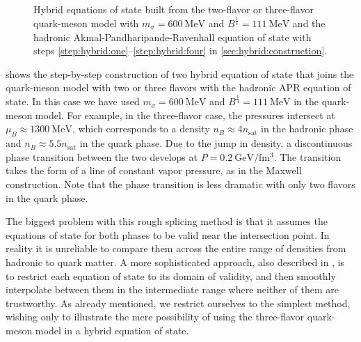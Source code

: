 \begin{figure}
\caption{\label{fig:hybrid:eos}%
Hybrid equations of state built from
the two-flavor or three-flavor quark-meson model
with $m_\sigma=\SI{600}{\mega\electronvolt}$ and $B^\frac14 = \SI{111}{\mega\electronvolt}$
and the hadronic Akmal-Pandharipande-Ravenhall equation of state
with steps \ref{step:hybrid:one}--\ref{step:hybrid:four} in \cref{sec:hybrid:construction}.
}
\end{figure}

 shows the step-by-step construction of two hybrid equation of state that joins the quark-meson model with two or three flavors with the hadronic APR equation of state.
In this case we have used $m_\sigma=\SI{600}{\mega\electronvolt}$ and $B^\frac14 = \SI{111}{\mega\electronvolt}$ in the quark-meson model.
For example, in the three-flavor case, the pressures intersect at $\mu_B \approx \SI{1300}{\mega\electronvolt}$, which corresponds to a density $n_B \approx 4 n_\text{sat}$ in the hadronic phase and $n_B \approx 5.5 n_\text{sat}$ in the quark phase.
Due to the jump in density, a discontinuous phase transition between the two develops at $P = \SI{0.2}{\giga\electronvolt\per\femto\meter\cubed}$.
The transition takes the form of a line of constant vapor pressure, as in the Maxwell construction.
Note that the phase transition is less dramatic with only two flavors in the quark phase.

The biggest problem with this rough splicing method is that it assumes the equations of state for both phases to be valid near the intersection point.
In reality it is unreliable to compare them across the entire range of densities from hadronic to quark matter.
A more sophisticated approach, also described in \cite[section V-F]{ref:quark_star_review},
is to restrict each equation of state to its domain of validity,
and then smoothly interpolate between them in the intermediate range where neither of them are trustworthy.
As already mentioned, we restrict ourselves to the simplest method,
wishing only to illustrate the mere possibility of using the three-flavor quark-meson model in a hybrid equation of state.

